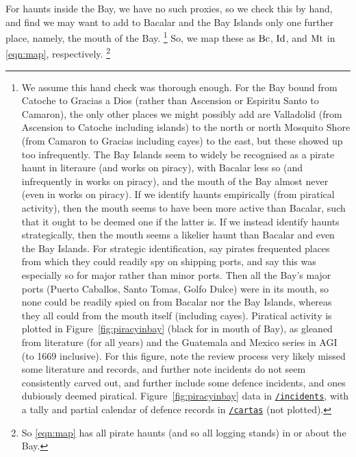 		For haunts inside the Bay, we have no such proxies, so we check this by hand, and find we may want to add to Bacalar and the Bay Islands only one further place, namely, the mouth of the Bay.%
		\footnote{We assume this hand check was thorough enough. For the Bay bound from Catoche to Gracias a Dios (rather than Ascension or Espiritu Santo to Camaron), the only other places we might possibly add are Valladolid (from Ascension to Catoche including islands) to the north or north Mosquito Shore (from Camaron to Gracias including cayes) to the east, but these showed up too infrequently. The Bay Islands seem to widely be recognised as a pirate haunt in literaure (and works on piracy), with Bacalar less so (and infrequently in works on piracy), and the mouth of the Bay almost never (even in works on piracy). If we identify haunts empirically (from piratical activity), then the mouth seems to have been more active than Bacalar, such that it ought to be deemed one if the latter is. If we instead identify haunts strategically, then the mouth seems a likelier haunt than Bacalar and even the Bay Islands. For strategic identification, say pirates frequented places from which they could readily spy on shipping ports, and say this was especially so for major rather than minor ports. Then all the Bay's major ports (Puerto Caballos, Santo Tomas, Golfo Dulce) were in its mouth, so none could be readily spied on from Bacalar nor the Bay Islands, whereas they all could from the mouth itself (including cayes). Piratical activity is plotted in Figure~\ref{fig:piracyinbay} (black for in mouth of Bay), as gleaned from literature (for all years) and the Guatemala and Mexico series in AGI (to 1669 inclusive). For this figure, note the review process very likely missed some literature and records, and further note incidents do not seem consistently carved out, and further include some defence incidents, and ones dubiously deemed piratical. Figure~\ref{fig:piracyinbay} data in \href{https://github.com/aenavidad/pp-0/tree/main/incidents}{\nolinkurl{/incidents}}, with a tally and partial calendar of defence records in \href{https://github.com/aenavidad/pp-0/tree/main/cartas}{\nolinkurl{/cartas}} (not plotted).} %
		So, we map these as \(\operatorname{Bc}\), \(\operatorname{Id}\), and \(\operatorname{Mt}\) in \ref{eqn:map}, respectively.%
		\footnote{So \ref{eqn:map} has all pirate haunts (and so all logging stands) in or about the Bay.}
	
